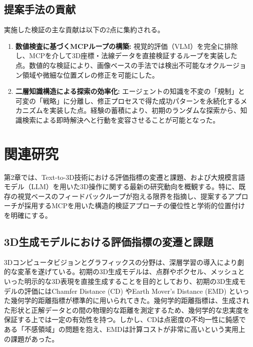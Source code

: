 \documentclass[dvipdfmx, a4paper, 9pt]{deimj}
\begin{document}
\subsection{提案手法の貢献}

実施した検証の主な貢献は以下の2点に集約される。
\begin{enumerate}
    \item \textbf{数値検査に基づくMCPループの構築:} 
    視覚的評価（VLM）を完全に排除し、MCPを介して3D座標・法線データを直接検証するループを実装した点。数値的な検証により、画像ベースの手法では検出不可能なオクルージョン領域や微細な位置ズレの修正を可能にした。
    \item \textbf{二層知識構造による探索の効率化:} 
    エージェントの知識を不変の「規制」と可変の「戦略」に分離し、修正プロセスで得た成功パターンを永続化するメカニズムを実装した点。経験の蓄積により、初期のランダムな探索から、知識検索による即時解決へと行動を変容させることが可能となった。
\end{enumerate}

\section{関連研究}

第2章では、Text-to-3D技術における評価指標の変遷と課題、および大規模言語モデル（LLM）を用いた3D操作に関する最新の研究動向を概観する。特に、既存の視覚ベースのフィードバックループが抱える限界を指摘し、提案するアプローチが採用するMCPを用いた構造的検証アプローチの優位性と学術的位置付けを明確にする。

\subsection{3D生成モデルにおける評価指標の変遷と課題}

3Dコンピュータビジョンとグラフィックスの分野は、深層学習の導入により劇的な変革を遂げている。初期の3D生成モデルは、点群やボクセル、メッシュといった明示的な3D表現を直接生成することを目的としており、初期の3D生成モデルの評価にはChamfer Distance (CD) やEarth Mover's Distance (EMD) といった幾何学的距離指標が標準的に用いられてきた\cite{fan2017point,nichol2022point}。幾何学的距離指標は、生成された形状と正解データとの間の物理的な距離を測定するため、幾何学的な忠実度を保証する上では一定の有効性を持つ。しかし、CDは点密度の不均一性に鈍感である「不感領域」の問題を抱え、EMDは計算コストが非常に高いという実用上の課題があった。
\end{document}
